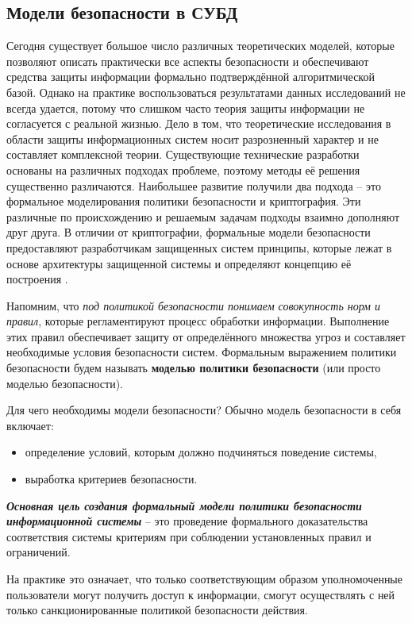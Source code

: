 \subsection{Модели безопасности в СУБД}

Сегодня существует большое число различных теоретических моделей, которые позволяют описать 
практически все аспекты безопасности и обеспечивают средства защиты информации формально 
подтверждённой алгоритмической базой. Однако на практике воспользоваться результатами данных 
исследований не всегда удается, потому что слишком часто теория защиты информации не согласуется 
с реальной жизнью. Дело в том, что теоретические исследования в области защиты информационных 
систем носит разрозненный характер и не составляет комплексной теории. Существующие технические 
разработки основаны на различных подходах проблеме, поэтому методы её решения существенно 
различаются. Наибольшее развитие получили два подхода -- это формальное моделирования политики 
безопасности и криптография. Эти различные по происхождению и решаемым задачам подходы взаимно 
дополняют друг друга. В отличии от криптографии, формальные модели безопасности предоставляют 
разработчикам защищенных систем принципы, которые лежат в основе архитектуры защищенной системы 
и определяют концепцию её построения \autocite{Zegzhda}.

Напомним, что \textit{под политикой безопасности понимаем совокупность норм и правил}, которые 
регламентируют процесс обработки информации. Выполнение этих правил обеспечивает защиту от 
определённого множества угроз и составляет необходимые условия безопасности систем. Формальным 
выражением политики безопасности будем называть \textbf{моделью политики безопасности} (или 
просто моделью безопасности).

Для чего необходимы модели безопасности? Обычно модель безопасности в себя включает:
\begin{itemize}
    \item определение условий, которым должно подчиняться поведение системы,
    \item выработка критериев безопасности.
\end{itemize}
\textbf{\textit{Основная цель создания формальный модели политики безопасности информационной 
системы}} -- это проведение формального доказательства соответствия системы критериям при 
соблюдении установленных правил и ограничений.

На практике это означает, что только соответствующим образом уполномоченные пользователи могут 
получить доступ к информации, смогут осуществлять с ней только санкционированные политикой 
безопасности действия.

